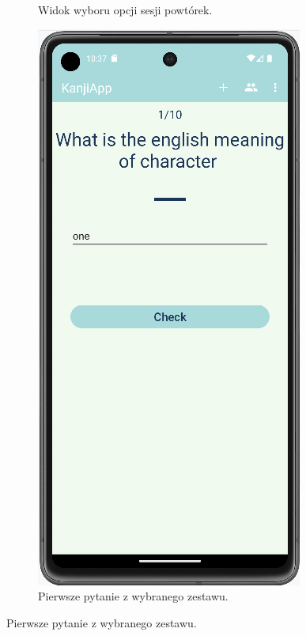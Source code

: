 \documentclass[a4paper,twoside,12pt]{book}
\begin{document}
\begin{figure}
\begin{subfigure}{0.3\textwidth}
   \caption{Widok wyboru opcji sesji powtórek.}
   \label{fig:options}
\end{subfigure}
\hfill
\begin{subfigure}{0.3\textwidth}
   \includegraphics[width=\textwidth]{learn/start}
   \caption{Pierwsze pytanie z wybranego zestawu.}
   \label{fig:start}
\end{subfigure}


\end{figure}
\end{document}
